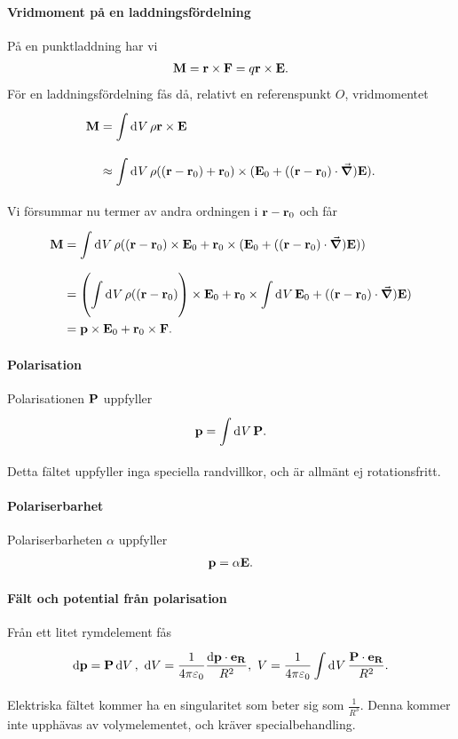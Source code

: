 \paragraph{Vridmoment på en laddningsfördelning}
På en punktladdning har vi
\begin{align*}
	\vb{M} = \vb{r}\times\vb{F} = q\vb{r}\times\vb{E}.
\end{align*}
För en laddningsfördelning fås då, relativt en referenspunkt $O$, vridmomentet
\begin{align*}
	\vb{M} &= \int\limits_{}^{}\dd[]{V}\rho\vb{r}\times\vb{E} \\
	       &\approx \int\limits_{}^{}\dd[]{V}\rho((\vb{r} - \vb{r}_{0}) + \vb{r}_{0})\times(\vb{E}_{0} + ((\vb{r} - \vb{r}_{0})\cdot\grad)\vb{E}).
\end{align*}
Vi försummar nu termer av andra ordningen i $\vb{r} - \vb{r}_{0}$ och får
\begin{align*}
	\vb{M} &= \int\limits_{}^{}\dd[]{V}\rho((\vb{r} - \vb{r}_{0})\times\vb{E}_{0} + \vb{r}_{0}\times(\vb{E}_{0} + ((\vb{r} - \vb{r}_{0})\cdot\grad)\vb{E})) \\
	       &= \left(\int\limits_{}^{}\dd[]{V}\rho((\vb{r} - \vb{r}_{0})\right)\times\vb{E}_{0} + \vb{r}_{0}\times\int\limits_{}^{}\dd[]{V}\vb{E}_{0} + ((\vb{r} - \vb{r}_{0})\cdot\grad)\vb{E}) \\
	       &= \vb{p}\times\vb{E}_{0} + \vb{r}_{0}\times\vb{F}.
\end{align*}

\paragraph{Polarisation}
Polarisationen $\vb{P}$ uppfyller
\begin{align*}
	\vb{p} = \int\limits_{}^{}\dd[]{V}\vb{P}.
\end{align*}
Detta fältet uppfyller inga speciella randvillkor, och är allmänt ej rotationsfritt.

\paragraph{Polariserbarhet}
Polariserbarheten $\alpha$ uppfyller
\begin{align*}
	\vb{p} = \alpha\vb{E}.
\end{align*}

\paragraph{Fält och potential från polarisation}
Från ett litet rymdelement fås
\begin{align*}
	\dd{\vb{p}} = \vb{P}\dd{V},\ \dd{V} = \frac{1}{4\pi\varepsilon_{0}}\frac{\dd{\vb{p}}\cdot\vb{e}_{\vb{R}}}{R^{2}},\ V = \frac{1}{4\pi\varepsilon_{0}}\int\limits_{}^{}\dd[]{V}\frac{\vb{P}\cdot\vb{e}_{\vb{R}}}{R^{2}}.
\end{align*}
Elektriska fältet kommer ha en singularitet som beter sig som $\frac{1}{R^{3}}$. Denna kommer inte upphävas av volymelementet, och kräver specialbehandling.


